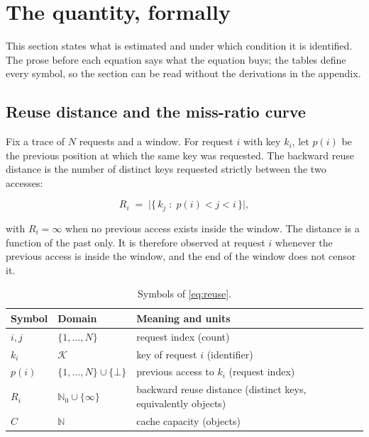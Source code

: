 \section{The quantity, formally}
\label{sec:formalization}

This section states what is estimated and under which condition it is identified.
The prose before each equation says what the equation buys; the tables define every
symbol, so the section can be read without the derivations in the appendix.

\subsection{Reuse distance and the miss-ratio curve}
\label{sec:reuse}

Fix a trace of $N$ requests and a window. For request $i$ with key $k_i$, let $p(i)$
be the previous position at which the same key was requested. The backward reuse
distance is the number of distinct keys requested strictly between the two accesses:

\begin{equation}\label{eq:reuse}
  R_i \;=\; \bigl|\{\,k_j \;:\; p(i) < j < i\,\}\bigr|,
\end{equation}

with $R_i=\infty$ when no previous access exists inside the window. The distance is
a function of the past only. It is therefore observed at request $i$ whenever the
previous access is inside the window, and the end of the window does not censor it.

\begin{table}[t]
\centering
\footnotesize
\caption{Symbols of \cref{eq:reuse}.}
\label{tab:sym-reuse}
\begin{tabular}{@{}l l l@{}}
\toprule
Symbol & Domain & Meaning and units \\
\midrule
$i,j$ & $\{1,\dots,N\}$ & request index (count) \\
$k_i$ & $\mathcal{K}$ & key of request $i$ (identifier) \\
$p(i)$ & $\{1,\dots,N\}\cup\{\bot\}$ & previous access to $k_i$ (request index) \\
$R_i$ & $\mathbb{N}_0\cup\{\infty\}$ & backward reuse distance (distinct keys, equivalently objects) \\
$C$ & $\mathbb{N}$ & cache capacity (objects) \\
\bottomrule
\end{tabular}
\end{table}

